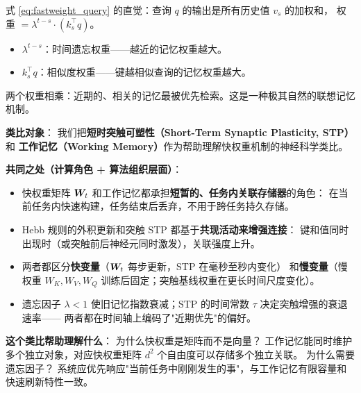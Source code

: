 \begin{insight}[title=时间加权相似度检索]
式 \eqref{eq:fastweight_query} 的直觉：查询 $q$ 的输出是所有历史值 $v_s$ 的加权和，
权重 $= \lambda^{t-s} \cdot (k_s^\top q)$。
\begin{itemize}
  \item $\lambda^{t-s}$：时间遗忘权重——越近的记忆权重越大。
  \item $k_s^\top q$：相似度权重——键越相似查询的记忆权重越大。
\end{itemize}
两个权重相乘：近期的、相关的记忆最被优先检索。这是一种极其自然的联想记忆机制。
\end{insight}

\begin{neurosciencebox}[title=神经科学直觉：短时突触可塑性与快权重的时间尺度]
\textbf{类比对象}：
我们把\textbf{短时突触可塑性（Short-Term Synaptic Plasticity, STP）}和
\textbf{工作记忆（Working Memory）}作为帮助理解快权重机制的神经科学类比。

\textbf{共同之处（计算角色 + 算法组织层面）}：
\begin{itemize}
  \item 快权重矩阵 $\boldsymbol{W}_t$ 和工作记忆都承担\textbf{短暂的、任务内关联存储器}的角色：
    在当前任务内快速构建，任务结束后丢弃，不用于跨任务持久存储。
  \item Hebb 规则的外积更新和突触 STP 都基于\textbf{共现活动来增强连接}：
    键和值同时出现时（或突触前后神经元同时激发），关联强度上升。
  \item 两者都区分\textbf{快变量}（$\boldsymbol{W}_t$ 每步更新，STP 在毫秒至秒内变化）
    和\textbf{慢变量}（慢权重 $W_K, W_V, W_Q$ 训练后固定；突触基线权重在更长时间尺度变化）。
  \item 遗忘因子 $\lambda < 1$ 使旧记忆指数衰减；STP 的时间常数 $\tau$ 决定突触增强的衰退速率——
    两者都在时间轴上编码了"近期优先"的偏好。
\end{itemize}

\textbf{这个类比帮助理解什么}：
为什么快权重是矩阵而不是向量？
工作记忆能同时维护多个独立对象，对应快权重矩阵 $d^2$ 个自由度可以存储多个独立关联。
为什么需要遗忘因子？
系统应优先响应"当前任务中刚刚发生的事"，与工作记忆有限容量和快速刷新特性一致。
\end{neurosciencebox}

